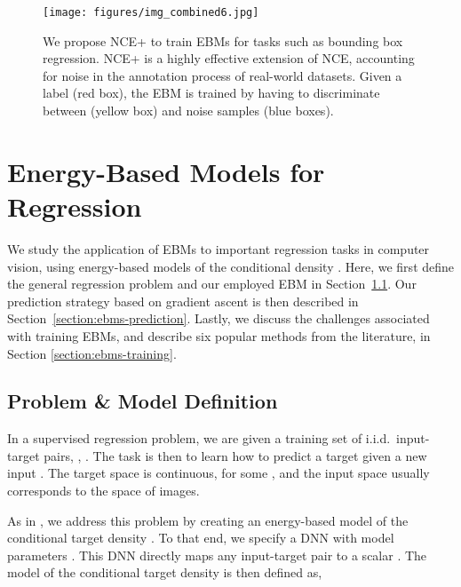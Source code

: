 \documentclass{bmvc2k}
\begin{document}
\begin{figure}[t]
    \centering
    \texttt{[image: figures/img\_combined6.jpg]}\vspace{-2.0mm}
    \caption{We propose NCE+ to train EBMs  for tasks such as bounding box regression. NCE+ is a highly effective extension of NCE, accounting for noise in the annotation process of real-world datasets. Given a label  (red box), the EBM is trained by having to discriminate between  (yellow box) and noise samples  (blue boxes).}\vspace{-3mm}
    \label{fig:overview}
\end{figure} \section{Energy-Based Models for Regression}
\label{section:ebms}
We study the application of EBMs to important regression tasks in computer vision, using energy-based models of the conditional density . Here, we first define the general regression problem and our employed EBM in Section~\ref{section:ebms-problem}. Our prediction strategy based on gradient ascent is then described in Section~\ref{section:ebms-prediction}. Lastly, we discuss the challenges associated with training EBMs, and describe six popular methods from the literature, in Section \ref{section:ebms-training}.











\subsection{Problem \& Model Definition}
\label{section:ebms-problem}
In a supervised regression problem, we are given a training set  of i.i.d.\ input-target pairs, , . The task is then to learn how to predict a target  given a new input . The target space  is continuous,  for some , and the input space  usually corresponds to the space of images.

As in \cite{gustafsson2019learning, danelljan2020probabilistic}, we address this problem by creating an energy-based model  of the conditional target density . To that end, we specify a DNN  with model parameters . This DNN directly maps any input-target pair  to a scalar . The model  of the conditional target density is then defined as,
\end{document}
